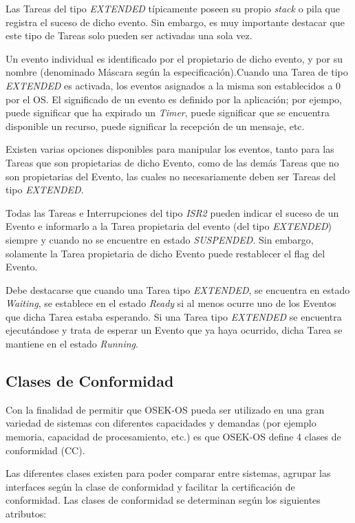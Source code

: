 \documentclass[12pt,letterpaper]{article}
\begin{document}
Las Tareas del tipo \textit{EXTENDED} típicamente poseen su propio \textit{stack} o pila que registra el suceso de dicho evento. Sin embargo, es muy importante destacar que este tipo de Tareas solo pueden ser activadas una sola vez.

Un evento individual es identificado por el propietario de dicho evento, y por su nombre (denominado Máscara según la especificación).Cuando una Tarea de tipo \textit{EXTENDED} es activada, los eventos asignados a la misma son establecidos a 0 por el OS. El significado de un evento es definido por la aplicación; por ejempo, puede significar que ha expirado un \textit{Timer}, puede significar que se encuentra disponible un recurso, puede significar la recepción de un mensaje, etc.

Existen varias opciones disponibles para manipular los eventos, tanto para las Tareas que son propietarias de dicho Evento, como de las demás Tareas que no son propietarias del Evento, las cuales no necesariamente deben ser Tareas del tipo \textit{EXTENDED}.

Todas las Tareas e Interrupciones del tipo \textit{ISR2} pueden indicar el suceso de un Evento e informarlo a la Tarea propietaria del evento (del tipo \textit{EXTENDED}) siempre y cuando no se encuentre en estado \textit{SUSPENDED}. Sin embargo, solamente la Tarea propietaria de dicho Evento puede restablecer el flag del Evento.

Debe destacarse que cuando una Tarea tipo \textit{EXTENDED}, se encuentra en estado \textit{Waiting}, se establece en el estado \textit{Ready} si al menos ocurre uno de los Eventos que dicha Tarea estaba esperando. Si una Tarea tipo \textit{EXTENDED} se encuentra ejecutándose y trata de esperar un Evento que ya haya ocurrido, dicha Tarea se mantiene en el estado \textit{Running}.

\subsection{Clases de Conformidad}
Con la finalidad de permitir que OSEK-OS pueda ser utilizado en una gran variedad de sistemas con diferentes capacidades y demandas (por ejemplo memoria, capacidad de procesamiento, etc.) es que OSEK-OS define 4 clases de conformidad (CC).

Las diferentes clases existen para poder comparar entre sistemas, agrupar las interfaces según la clase de conformidad y facilitar la certificación de conformidad. Las clases de conformidad se determinan según los siguientes atributos: 
\end{document}
